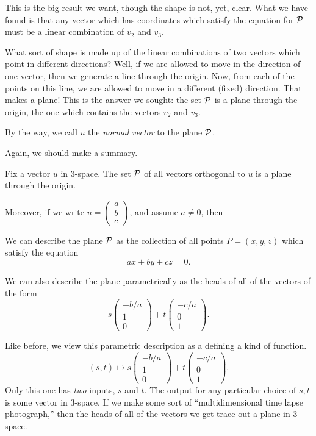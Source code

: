 \documentclass[00-livre-main.tex]{subfiles}
\begin{document}
This is the big result we want, though the shape is not, yet, clear. What we have found is that any vector which has coordinates which satisfy the equation for $\mathcal{P}$ must be a linear combination of $v_2$ and $v_3$. 

What sort of shape is made up of the linear combinations of two vectors which point in different directions? Well, if we are allowed to move in the direction of one vector, then we generate a line through the origin. Now, from each of the points on this line, we are allowed to move in a different (fixed) direction. That makes a plane! This is the answer we sought: the set $\mathcal{P}$ is a plane through the origin, the one which contains the vectors $v_2$ and $v_3$. 

By the way, we call $u$ the \emph{normal vector} to the plane $\mathcal{P}$.

Again, we should make a summary.

\begin{theorem}\label{thm:origin-plane-descr}
Fix a vector $u$ in $3$-space. The set $\mathcal{P}$ of all vectors orthogonal to $u$ is a plane through the origin. 

Moreover, if we write $u = \left( \begin{smallmatrix} a\\ b \\ c \end{smallmatrix}\right)$, and assume $a\neq 0$, then
\begin{compactitem}
\item We can describe the plane $\mathcal{P}$ as the collection of all points $P = (x,y,z)$ which satisfy the equation
\[
ax + by  +cz = 0.
\]
\item We can also describe the plane parametrically as the heads of all of the vectors of the form
\[
s \begin{pmatrix} -b/a \\ 1 \\ 0\end{pmatrix} 
+ t \begin{pmatrix} -c/a\\ 0 \\ 1 \end{pmatrix} .
\]
\end{compactitem}
\end{theorem}

Like before, we view this parametric description as a defining a kind of function. 
\[
(s,t) \mapsto s \begin{pmatrix} -b/a \\ 1 \\ 0\end{pmatrix} 
+ t \begin{pmatrix} -c/a\\ 0 \\ 1 \end{pmatrix} .
\]
Only this one has \emph{two} inputs, $s$ and $t$. The output for any particular choice of $s,t$ is some vector in $3$-space. If we make some sort of ``multidimensional time lapse photograph,'' then the heads of all of the vectors we get trace out a plane in $3$-space.
\end{document}
